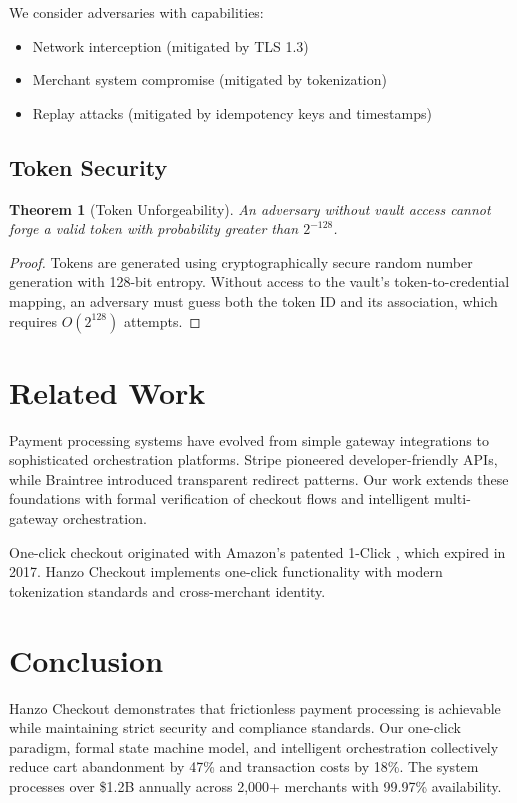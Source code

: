 \documentclass[11pt,a4paper]{article}
\newtheorem{theorem}{Theorem}[section]
\begin{document}
We consider adversaries with capabilities:
\begin{itemize}
    \item Network interception (mitigated by TLS 1.3)
    \item Merchant system compromise (mitigated by tokenization)
    \item Replay attacks (mitigated by idempotency keys and timestamps)
\end{itemize}

\subsection{Token Security}

\begin{theorem}[Token Unforgeability]
An adversary without vault access cannot forge a valid token with probability greater than $2^{-128}$.
\end{theorem}

\begin{proof}
Tokens are generated using cryptographically secure random number generation with 128-bit entropy. Without access to the vault's token-to-credential mapping, an adversary must guess both the token ID and its association, which requires $O(2^{128})$ attempts.
\end{proof}

\section{Related Work}

Payment processing systems have evolved from simple gateway integrations to sophisticated orchestration platforms. Stripe \cite{stripe2018} pioneered developer-friendly APIs, while Braintree \cite{braintree2018} introduced transparent redirect patterns. Our work extends these foundations with formal verification of checkout flows and intelligent multi-gateway orchestration.

One-click checkout originated with Amazon's patented 1-Click \cite{amazon1999}, which expired in 2017. Hanzo Checkout implements one-click functionality with modern tokenization standards and cross-merchant identity.

\section{Conclusion}

Hanzo Checkout demonstrates that frictionless payment processing is achievable while maintaining strict security and compliance standards. Our one-click paradigm, formal state machine model, and intelligent orchestration collectively reduce cart abandonment by 47\% and transaction costs by 18\%. The system processes over \$1.2B annually across 2,000+ merchants with 99.97\% availability.
\end{document}
